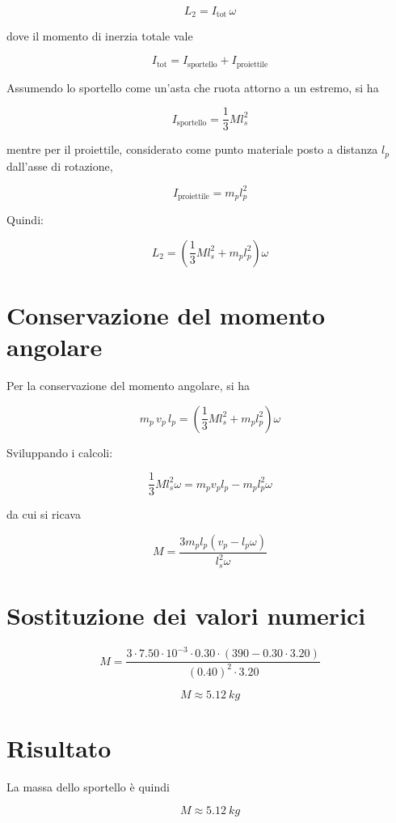 \documentclass[a4paper,12pt]{article}
\begin{document}
\[
L_2 = I_{\text{tot}} \, \omega
\]

dove il momento di inerzia totale vale

\[
I_{\text{tot}} = I_{\text{sportello}} + I_{\text{proiettile}}
\]

Assumendo lo sportello come un'asta che ruota attorno a un estremo, si ha

\[
I_{\text{sportello}} = \frac{1}{3} M l_s^2
\]

mentre per il proiettile, considerato come punto materiale posto a distanza
$l_p$ dall'asse di rotazione,

\[
I_{\text{proiettile}} = m_p l_p^2
\]

Quindi:

\[
L_2 = \left( \frac{1}{3} M l_s^2 + m_p l_p^2 \right)\omega
\]

\section*{Conservazione del momento angolare}

Per la conservazione del momento angolare, si ha

\[
m_p \, v_p \, l_p
=
\left( \frac{1}{3} M l_s^2 + m_p l_p^2 \right)\omega
\]

Sviluppando i calcoli:

\[
\frac{1}{3} M l_s^2 \omega
=
m_p v_p l_p - m_p l_p^2 \omega
\]

da cui si ricava

\[
M
=
\frac{3 m_p l_p \left( v_p - l_p \omega \right)}{l_s^2 \omega}
\]

\section*{Sostituzione dei valori numerici}

\[
M
=
\frac{
3 \cdot 7.50 \cdot 10^{-3} \cdot 0.30 \cdot
\left(390 - 0.30 \cdot 3.20\right)
}{
(0.40)^2 \cdot 3.20
}
\]

\[
M \approx \SI{5.12}{kg}
\]

\section*{Risultato}

La massa dello sportello è quindi

\[
\boxed{M \approx \SI{5.12}{kg}}
\]
\end{document}
